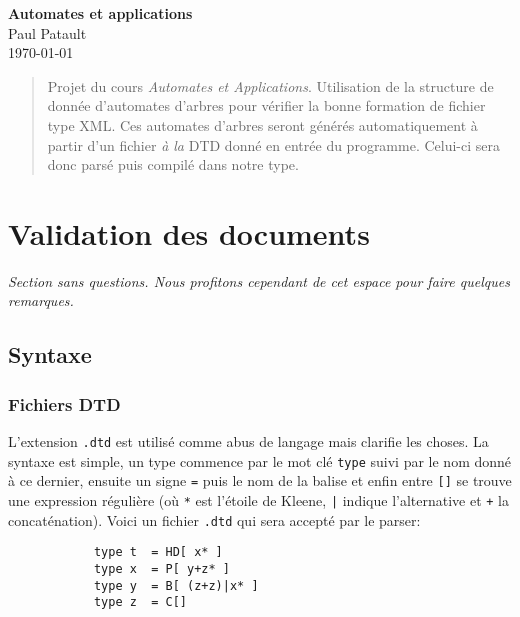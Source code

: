 \documentclass[twoside,12pt]{article}
\begin{document}

\thispagestyle{empty}

\vspace*{1.3cm}
\begin{center}
    \textbf{\LARGE Automates et applications} \\
    \bigskip\bigskip
    {\large Paul Patault} \\ %
    \bigskip
    \today
    \bigskip
\end{center}

\begin{abstract}
    Projet du cours \textit{Automates et Applications}. Utilisation de la structure
    de donnée d'automates d'arbres pour vérifier la bonne formation de fichier type
    XML. Ces automates d'arbres seront générés automatiquement à partir d'un fichier
    \textit{à la} DTD donné en entrée du programme. Celui-ci sera donc parsé puis
    compilé dans notre type.
\end{abstract}


\section{Validation des documents}
\textit{Section sans questions. Nous profitons cependant de cet espace pour faire quelques
remarques.}

\subsection{Syntaxe}

\subsubsection{Fichiers DTD}

L'extension \texttt{.dtd} est utilisé comme abus de langage mais clarifie les choses.
La syntaxe est simple, un type commence par le mot clé \og\texttt{type}\fg{} suivi
par le nom donné à ce dernier, ensuite un signe \og\texttt{=}\fg{} puis le nom de
la balise et enfin entre \og\texttt{[]}\fg{} se trouve une expression régulière
(où \og\texttt{*}\fg{} est l'étoile de Kleene, \og\texttt{|}\fg{} indique
l'alternative et \og\texttt{+}\fg{} la concaténation).
Voici un fichier \texttt{.dtd} qui sera accepté par le parser:
  \begin{verbatim}
            type t  = HD[ x* ]
            type x  = P[ y+z* ]
            type y  = B[ (z+z)|x* ]
            type z  = C[]
  \end{verbatim}
\end{document}
